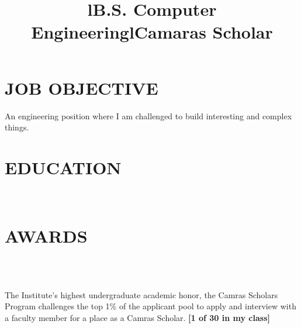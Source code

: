 \documentclass{res}
\begin{document}
 

\address{\\{\bf  PRESENT ADDRESS}\\3366 S. Michigan Ave \\Chicago, IL 60616\\(630) 450-5725}
\address{\\{\bf PERMANENT ADDRESS}\\2558 Breckeridge Ct.\\Aurora, IL 60504 \\  (630) 978-1952}
                                  
                                  
\begin{resume}
\section{JOB OBJECTIVE}          
    An engineering position where I am challenged to build interesting and complex things.
 
\section{EDUCATION}          

\begin{format}
  \title{l}  \\
\end{format}
\title{B.S. Computer Engineering}
\begin{position}
\end{position}

\section{AWARDS}          
\begin{format}
  \title{l} \\
  \body\\
\end{format}
\title{\bf Camaras Scholar}
\dates{}
\begin{position}
        The Institute's highest undergraduate academic honor, the Camras Scholars Program challenges the top 1\% of the applicant pool to apply and interview with a faculty member for a place as a Camras Scholar. {\bf [1 of 30 in my class]}
\end{position}


\end{resume}
\end{document}
